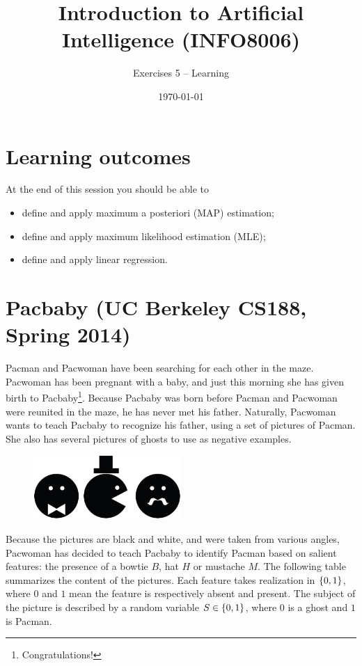 \documentclass[11pt, a4paper]{article}
\title{Introduction to Artificial Intelligence (INFO8006)}
\subtitle{Exercises 5 -- Learning}
\date{\today}
\begin{document}
\maketitle

\section*{Learning outcomes}

At the end of this session you should be able to
\begin{itemize}[noitemsep]
    \item define and apply maximum a posteriori (MAP) estimation;
    \item define and apply maximum likelihood estimation (MLE);
    \item define and apply linear regression.
\end{itemize}

\section{Pacbaby (UC Berkeley CS188, Spring 2014)}

Pacman and Pacwoman have been searching for each other in the maze. Pacwoman has been pregnant with a baby, and just this morning she has given birth to Pacbaby\footnote{Congratulations!}. Because Pacbaby was born before Pacman and Pacwoman were reunited in the maze, he has never met his father. Naturally, Pacwoman wants to teach Pacbaby to recognize his father, using a set of pictures of Pacman. She also has several pictures of ghosts to use as negative examples.

\begin{figure}[h]
    \centering
    \includegraphics[width=0.5\textwidth]{figures/e5_pacbaby.jpg}
\end{figure}

Because the pictures are black and white, and were taken from various angles, Pacwoman has decided to teach Pacbaby to identify Pacman based on salient features: the presence of a bowtie $B$, hat $H$ or mustache $M$. The following table summarizes the content of the pictures. Each feature takes realization in $\{0, 1\}$, where $0$ and $1$ mean the feature is respectively absent and present. The subject of the picture is described by a random variable $S \in \{0, 1\}$, where $0$ is a ghost and $1$ is Pacman.
\end{document}
